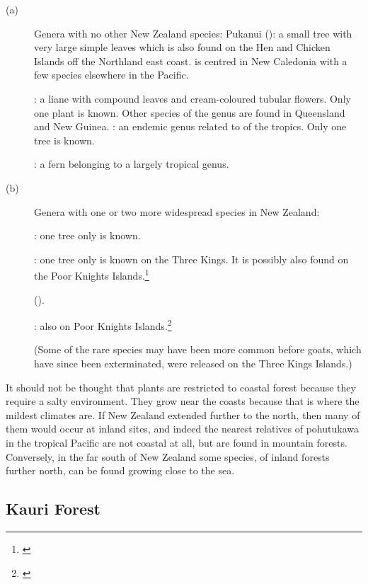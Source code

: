 \begin{description}
\item[{(a)}]Genera with no other New Zealand species: Pukanui (): a small tree with very large simple leaves which is also found on the Hen and Chicken Islands off the Northland east coast.  is centred in New Caledonia with a few species elsewhere in the Pacific.

: a liane with compound leaves and cream-coloured tubular flowers.
Only one plant is known.
Other species of the genus are found in Queensland and New Guinea. : an endemic genus related to  of the tropics.
Only one tree is known.

: a fern belonging to a largely tropical genus.
\item[{(b)}]Genera with one or two more widespread species in New Zealand:

: one tree only is known.

: one tree only is known on the Three Kings.
It is possibly also found on the Poor Knights Islands.\footnote{\cite{wright1983conservation}}

 ().

: also on Poor Knights Islands.\footnote{\cite{wright1983conservation}}

(Some of the rare species may have been more common before goats, which have since been exterminated, were released on the Three Kings Islands.)
\end{description}

It should not be thought that plants are restricted to coastal forest because they require a salty environment.
They grow near the coasts because that is where the mildest climates are.
If New Zealand extended further to the north, then many of them would occur at inland sites, and indeed the nearest relatives of pohutukawa in the tropical Pacific are not coastal at all, but are found in mountain forests.
Conversely, in the far south of New Zealand some species, of inland forests further north, can be found growing close to the sea.

\subsection{Kauri Forest}

